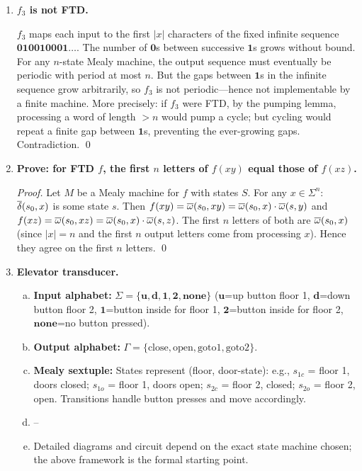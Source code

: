 \begin{enumerate}[{7.}1.]
\item \textbf{$f_3$ is not FTD.}

$f_3$ maps each input to the first $|x|$ characters of the fixed infinite sequence $\pmb{010010001\ldots}$.  The number of $\pmb{0}$s between successive $\pmb{1}$s grows without bound.  For any $n$-state Mealy machine, the output sequence must eventually be periodic with period at most $n$.  But the gaps between $\pmb{1}$s in the infinite sequence grow arbitrarily, so $f_3$ is not periodic---hence not implementable by a finite machine.  More precisely: if $f_3$ were FTD, by the pumping lemma, processing a word of length $>n$ would pump a cycle; but cycling would repeat a finite gap between $\pmb{1}$s, preventing the ever-growing gaps.  Contradiction. \qed

\item \textbf{Prove: for FTD $f$, the first $n$ letters of $f(xy)$ equal those of $f(xz)$.}

\begin{proof}
Let $M$ be a Mealy machine for $f$ with states $S$.  For any $x\in\Sigma^n$:
$\overline{\delta}(s_0,x)$ is some state $s$.  Then $f(xy)=\overline{\omega}(s_0,xy)=\overline{\omega}(s_0,x)\cdot\overline{\omega}(s,y)$ and $f(xz)=\overline{\omega}(s_0,xz)=\overline{\omega}(s_0,x)\cdot\overline{\omega}(s,z)$.  The first $n$ letters of both are $\overline{\omega}(s_0,x)$ (since $|x|=n$ and the first $n$ output letters come from processing $x$).  Hence they agree on the first $n$ letters. \qed
\end{proof}

\item \textbf{Elevator transducer.}

\begin{enumerate}[(a)]
  \item \textbf{Input alphabet:} $\Sigma=\{\pmb{u},\pmb{d},\pmb{1},\pmb{2},\pmb{none}\}$ ($\pmb{u}$=up button floor 1, $\pmb{d}$=down button floor 2, $\pmb{1}$=button inside for floor 1, $\pmb{2}$=button inside for floor 2, $\pmb{none}$=no button pressed).

  \item \textbf{Output alphabet:} $\Gamma=\{\text{close},\text{open},\text{goto1},\text{goto2}\}$.

  \item \textbf{Mealy sextuple:} States represent (floor, door-state): e.g., $s_{1c}$ = floor 1, doors closed; $s_{1o}$ = floor 1, doors open; $s_{2c}$ = floor 2, closed; $s_{2o}$ = floor 2, open.  Transitions handle button presses and move accordingly.

  \item--\item[g.] Detailed diagrams and circuit depend on the exact state machine chosen; the above framework is the formal starting point.
\end{enumerate}


\end{enumerate}
